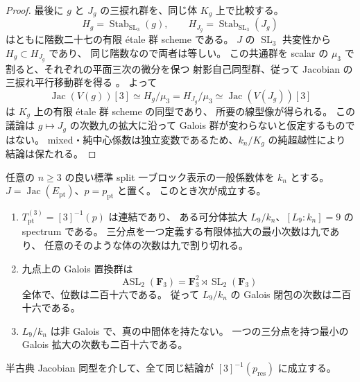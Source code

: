 \begin{proof}
最後に $g$ と $J_g$ の三捩れ群を、同じ体 $K_g$ 上で比較する。
\[
 H_g=\operatorname{Stab}_{\operatorname{SL}_3}(g),\qquad
 H_{J_g}=\operatorname{Stab}_{\operatorname{SL}_3}(J_g)
\]
はともに階数二十七の有限 \'etale 群 scheme である。
$J$ の $\operatorname{SL}_3$ 共変性から $H_g\subset H_{J_g}$ であり、
同じ階数なので両者は等しい。
この共通群を scalar の $\mu_3$ で割ると、それぞれの平面三次の微分を保つ
射影自己同型群、従って Jacobian の三捩れ平行移動群を得る
\cite[proof of Lemma~2.3]{NFMFisherTernary}。
よって
\[
 \operatorname{Jac}(V(g))[3]
 \simeq H_g/\mu_3
 =H_{J_g}/\mu_3
 \simeq\operatorname{Jac}(V(J_g))[3]
\]
は $K_g$ 上の有限 \'etale 群 scheme の同型であり、
所要の線型像が得られる。
この議論は $g\mapsto J_g$ の次数九の拡大に沿って
Galois 群が変わらないと仮定するものではない。
mixed・純中心係数は独立変数であるため、$k_n/K_g$ の純超越性により結論は保たれる。
\end{proof}

\begin{theorem}
\label{thm:nfm-generic-point-third-division-monodromy}
任意の $n\ge3$ の良い標準 split 一ブロック表示の一般係数体を $k_n$ とする。
$J=\operatorname{Jac}(E_{\mathrm{pt}})$、$p=p_{\mathrm{pt}}$ と置く。
このとき次が成立する。
\begin{enumerate}
\item $T_{\mathrm{pt}}^{(3)}=[3]^{-1}(p)$ は連結であり、
ある可分体拡大 $L_9/k_n$、$[L_9:k_n]=9$ の spectrum である。
三分点を一つ定義する有限体拡大の最小次数は九であり、
任意のそのような体の次数は九で割り切れる。
\item 九点上の Galois 置換群は
\[
 \operatorname{ASL}_2(\mathbf F_3)
  =\mathbf F_3^2\rtimes\operatorname{SL}_2(\mathbf F_3)
\]
全体で、位数は二百十六である。
従って $L_9/k_n$ の Galois 閉包の次数は二百十六である。
\item $L_9/k_n$ は非 Galois で、真の中間体を持たない。
一つの三分点を持つ最小の Galois 拡大の次数も二百十六である。
\end{enumerate}
半古典 Jacobian 同型を介して、全て同じ結論が
$[3]^{-1}(p_{\mathrm{res}})$ に成立する。
\end{theorem}

